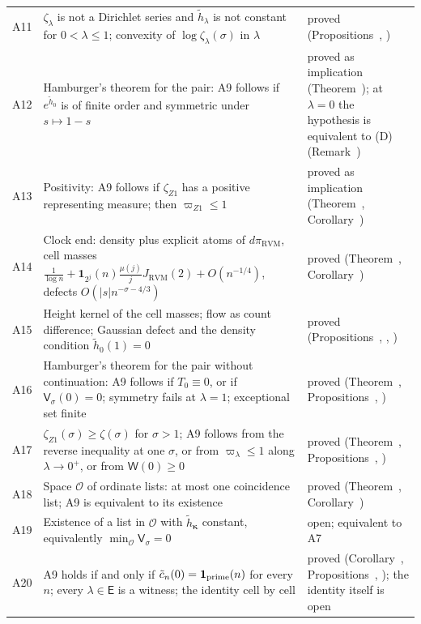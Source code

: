 \documentclass[11pt,reqno]{amsart}
\makeatletter
\let\CG@origref\ref
\let\CG@origeqref\eqref
\newcommand{\CG@gettip}[1]{\@ifundefined{CGTip@#1}{Reference: #1}{\csname CGTip@#1\endcsname}}
\DeclareRobustCommand{\CGref}[1]{\pdftooltip{\CG@origref{#1}}{\CG@gettip{#1}}}
\DeclareRobustCommand{\CGeqref}[1]{\pdftooltip{\CG@origeqref{#1}}{\CG@gettip{#1}}}
\numberwithin{equation}{section}
\theoremstyle{plain}
\theoremstyle{definition}
\theoremstyle{remark}
\newcommand{\RVM}{\mathrm{RVM}}
\makeatother
\begin{document}
\begin{longtable}{p{}p{}p{}}
A11 & $\zeta_\lambda$ is not a Dirichlet series and $\tilde h_\lambda$ is not constant for $0<\lambda\le1$; convexity of $\log\zeta_\lambda(\sigma)$ in $\lambda$ & proved (Propositions~\CGref{prop:nonconstant}, \CGref{prop:convexity})\\
A12 & Hamburger's theorem for the pair: A9 follows if $e^{\tilde h_0}$ is of finite order and symmetric under $s\mapsto1-s$ & proved as implication (Theorem~\CGref{thm:pair-criterion}); at $\lambda=0$ the hypothesis is equivalent to (D) (Remark~\CGref{rem:pair-no-slack})\\
A13 & Positivity: A9 follows if $\zeta_{Z1}$ has a positive representing measure; then $\varpi_{Z1}\le1$ & proved as implication (Theorem~\CGref{thm:positivity}, Corollary~\CGref{cor:positivity})\\
A14 & Clock end: density plus explicit atoms of $d\pi_{\RVM}$, cell masses $\frac1{\log n}+\mathbf1_{2^j}(n)\frac{\mu(j)}jJ_{\RVM}(2)+O(n^{-1/4})$, defects $O(|s|n^{-\sigma-4/3})$ & proved (Theorem~\CGref{thm:clock-density}, Corollary~\CGref{cor:clock-cells})\\
A15 & Height kernel of the cell masses; flow as count difference; Gaussian defect and the density condition $\tilde h_0(1)=0$ & proved (Propositions~\CGref{prop:height-kernels}, \CGref{prop:flow-count}, \CGref{prop:gaussian-defect})\\
A16 & Hamburger's theorem for the pair without continuation: A9 follows if $T_0\equiv0$, or if $\mathsf V_\sigma(0)=0$; symmetry fails at $\lambda=1$; exceptional set finite & proved (Theorem~\CGref{thm:double-hamburger}, Propositions~\CGref{prop:clock-asymmetry}, \CGref{prop:exceptional-set})\\
A17 & $\zeta_{Z1}(\sigma)\ge\zeta(\sigma)$ for $\sigma>1$; A9 follows from the reverse inequality at one $\sigma$, or from $\varpi_\lambda\le1$ along $\lambda\to0^+$, or from $\mathsf W(0)\ge0$ & proved (Theorem~\CGref{thm:real-axis}, Propositions~\CGref{prop:one-number}, \CGref{prop:open-path-varpi})\\
A18 & Space $\mathscr O$ of ordinate lists: at most one coincidence list; A9 is equivalent to its existence & proved (Theorem~\CGref{thm:rigidity}, Corollary~\CGref{cor:existence-form})\\
A19 & Existence of a list in $\mathscr O$ with $\tilde h_{\boldsymbol{\kappa}}$ constant, equivalently $\min_{\mathscr O}\mathsf V_\sigma=0$ & open; equivalent to A7\\
A20 & A9 holds if and only if $\tilde c_n(0)=\mathbf 1_{\rm prime}(n)$ for every $n$; every $\lambda\in\mathsf E$ is a witness; the identity \CGeqref{eq:per-cell} cell by cell & proved (Corollary~\CGref{cor:cell-mass-form}, Propositions~\CGref{prop:witness}, \CGref{prop:per-cell}); the identity \CGeqref{eq:per-cell} itself is open\\

\end{longtable}
\end{document}
